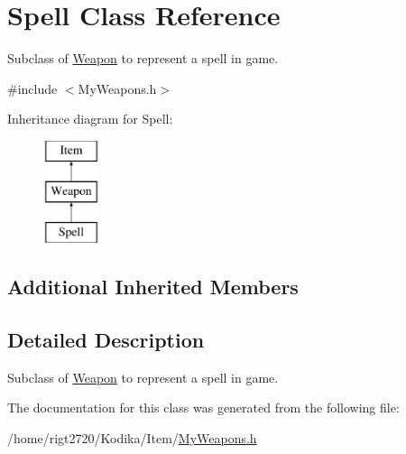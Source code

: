 \hypertarget{classSpell}{\section{Spell Class Reference}
\label{classSpell}
}


Subclass of \hyperlink{classWeapon}{Weapon} to represent a spell in game.  




{\ttfamily \#include $<$My\-Weapons.\-h$>$}

Inheritance diagram for Spell\-:\begin{figure}[H]
\begin{center}
\leavevmode
\includegraphics[height=3.000000cm]{classSpell}
\end{center}
\end{figure}
\subsection*{Additional Inherited Members}


\subsection{Detailed Description}
Subclass of \hyperlink{classWeapon}{Weapon} to represent a spell in game. 

The documentation for this class was generated from the following file\-:\begin{DoxyCompactItemize}
\item 
/home/rigt2720/\-Kodika/\-Item/\hyperlink{MyWeapons_8h}{My\-Weapons.\-h}\end{DoxyCompactItemize}
